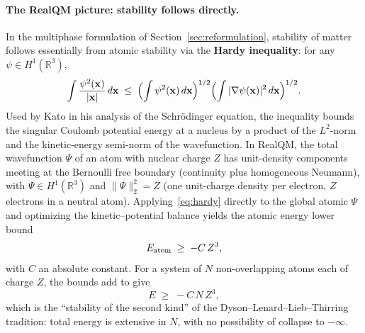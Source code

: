 \documentclass[11pt]{article}
\begin{document}
\paragraph{The RealQM picture: stability follows directly.}
In the multiphase formulation of Section~\ref{sec:reformulation}, stability of matter follows essentially from atomic stability via the \textbf{Hardy inequality}: for any $\psi \in H^1(\mathbb{R}^3)$,
\begin{equation}\label{eq:hardy}
\int \frac{\psi^2(\mathbf{x})}{|\mathbf{x}|} \, d\mathbf{x}
\;\le\;
\Bigl(\int \psi^2(\mathbf{x}) \, d\mathbf{x}\Bigr)^{1/2}
\Bigl(\int |\nabla \psi(\mathbf{x})|^2 \, d\mathbf{x}\Bigr)^{1/2}.
\end{equation}
Used by Kato in his analysis of the Schr\"odinger equation, the inequality bounds the singular Coulomb potential energy at a nucleus by a product of the $L^2$-norm and the kinetic-energy semi-norm of the wavefunction. In RealQM, the total wavefunction $\Psi$ of an atom with nuclear charge $Z$ has unit-density components meeting at the Bernoulli free boundary (continuity plus homogeneous Neumann), with $\Psi \in H^1(\mathbb{R}^3)$ and $\|\Psi\|_2^2 = Z$ (one unit-charge density per electron, $Z$ electrons in a neutral atom). Applying~\eqref{eq:hardy} directly to the global atomic $\Psi$ and optimizing the kinetic--potential balance yields the atomic energy lower bound
\begin{equation}\label{eq:atom-bound}
E_{\rm atom} \;\ge\; -C\, Z^3,
\end{equation}
with $C$ an absolute constant. For a system of $N$ non-overlapping atoms each of charge $Z$, the bounds add to give
\begin{equation}\label{eq:bulk-bound}
E \;\ge\; -C\, N\, Z^3,
\end{equation}
which is the ``stability of the second kind'' of the Dyson--Lenard--Lieb--Thirring tradition: total energy is extensive in $N$, with no possibility of collapse to $-\infty$.
\end{document}

